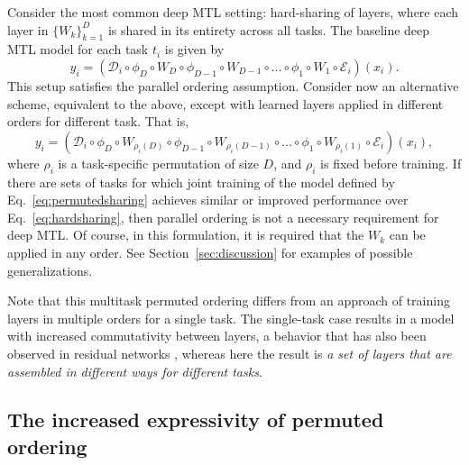 \documentclass{article}
\theoremstyle{definition}
\theoremstyle{remark}
\begin{document}
Consider the most common deep MTL setting: hard-sharing of layers, where each layer in $\{W_k\}_{k=1}^D$ is shared in its entirety across all tasks.
The baseline deep MTL model for each task $t_i$ is given by
\begin{equation} \label{eq:hardsharing}
y_i = (\mathcal{D}_i \circ \phi_D \circ W_D \circ \phi_{D-1} \circ W_{D-1} \circ \ldots \circ \phi_1 \circ W_1 \circ \mathcal{E}_i)(x_i).
\end{equation}
This setup satisfies the parallel ordering assumption. Consider now an alternative scheme, equivalent to the above, except with learned layers applied in different orders for different task. That is,
\begin{equation} \label{eq:permutedsharing}
y_i = (\mathcal{D}_i \circ \phi_D \circ W_{\rho_i(D)} \circ \phi_{D-1} \circ W_{\rho_i(D-1)} \circ \ldots \circ \phi_1 \circ W_{\rho_i(1)} \circ \mathcal{E}_i)(x_i),
\end{equation}
where $\rho_i$ is a task-specific permutation of size $D$, and $\rho_i$ is fixed before training. 
If there are sets of tasks for which joint training of the model defined by Eq.~\ref{eq:permutedsharing} achieves similar or improved performance over Eq.~\ref{eq:hardsharing}, then parallel ordering is not a necessary requirement for deep MTL.
Of course, in this formulation, it is required that the $W_k$ can be applied in any order. See Section~\ref{sec:discussion} for examples of possible generalizations. 

Note that this multitask permuted ordering differs from an approach of training layers in multiple orders for a single task.
The single-task case results in a model with increased commutativity between layers, a behavior that has also been observed in residual networks \citep{Veit:2016}, whereas here the result is \emph{a set of layers that are assembled in different ways for different tasks}.

\subsection{The increased expressivity of permuted ordering} \label{subsec:random_patterns}
\end{document}
